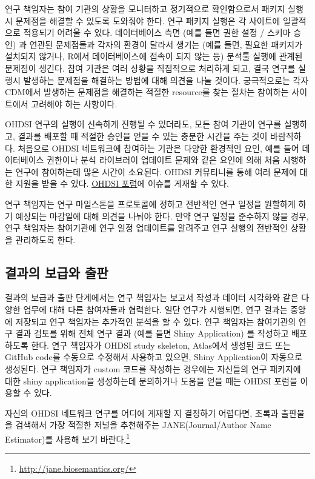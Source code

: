 \documentclass[11pt]{book}
\let\rmarkdownfootnote\footnote%
\def\footnote{\protect\rmarkdownfootnote}
\theoremstyle{definition}
\theoremstyle{definition}
\theoremstyle{definition}
\theoremstyle{remark}
\let\BeginKnitrBlock\begin \let\EndKnitrBlock\end
\begin{document}
연구 책임자는 참여 기관의 상황을 모니터하고 정기적으로 확인함으로서
패키지 실행시 문제점을 해결할 수 있도록 도와줘야 한다. 연구 패키지
실행은 각 사이트에 일괄적으로 적용되기 어려울 수 있다. 데이터베이스 측면
(예를 들면 권한 설정 / 스키마 승인) 과 연관된 문제점들과 각자의 환경이
달라서 생기는 (예를 들면, 필요한 패키지가 설치되지 않거나, R에서
데이터베이스에 접속이 되지 않는 등) 분석툴 실행에 관계된 문제점이
생긴다. 참여 기관은 여러 상황을 직접적으로 처리하게 되고, 결국 연구를
실행시 발생하는 문제점을 해결하는 방법에 대해 의견을 나눌 것이다.
궁극적으로는 각자 CDM에서 발생하는 문제점을 해결하는 적절한 resource를
찾는 절차는 참여하는 사이트에서 고려해야 하는 사항이다.

OHDSI 연구의 실행이 신속하게 진행될 수 있더라도, 모든 참여 기관이 연구를
실행하고, 결과를 배포할 때 적절한 승인을 얻을 수 있는 충분한 시간을 주는
것이 바람직하다. 처음으로 OHDSI 네트워크에 참여하는 기관은 다양한
환경적인 요인, 예를 들어 데이터베이스 권한이나 분석 라이브러이 업데이트
문제와 같은 요인에 의해 처음 시행하는 연구에 참여하는데 많은 시간이
소요된다. OHDSI 커뮤티니를 통해 여러 문제에 대한 지원을 받을 수 있다.
\href{http://forums.ohdsi.org}{OHDSI 포럼}에 이슈를 게재할 수 있다.

연구 책임자는 연구 마일스톤을 프로토콜에 정하고 전반적인 연구 일정을
원할하게 하기 예상되는 마감일에 대해 의견을 나눠야 한다. 만약 연구
일정을 준수하지 않을 경우, 연구 책임자는 참여기관에 연구 일정 업데이트를
알려주고 연구 실행의 전반적인 상황을 관리하도록 한다.

\subsection{결과의 보급와 출판}\label{--}

결과의 보급과 출판 단계에서는 연구 책임자는 보고서 작성과 데이터
시각화와 같은 다양한 업무에 대해 다른 참여자들과 협력한다. 일단 연구가
시행되면, 연구 결과는 중앙에 저장되고 연구 책임자는 추가적인 분석을 할
수 있다. 연구 책임자는 참여기관의 연구 결과 검토를 위해 전체 연구 결과
(예를 들면 Shiny Application) 를 작성하고 배포하도록 한다. 연구 책임자가
OHDSI study skeleton, Atlas에서 생성된 코드 또는 GitHub code를 수동으로
수정해서 사용하고 있으면, Shiny Application이 자동으로 생성된다. 연구
책임자가 custom 코드를 작성하는 경우에는 자신들의 연구 패키지에 대한
shiny application을 생성하는데 문의하거나 도움을 얻을 때는 OHDSI 포럼을
이용할 수 있다.

\BeginKnitrBlock{rmdimportant}
자신의 OHDSI 네트워크 연구를 어디에 게재할 지 결정하기 어렵다면, 초록과
출판물을 검색해서 가장 적절한 저널을 추천해주는 JANE(Journal/Author Name
Estimator)를 사용해 보기 바란다.\footnote{\url{http://jane.biosemantics.org/}}
\EndKnitrBlock{rmdimportant}
\end{document}

